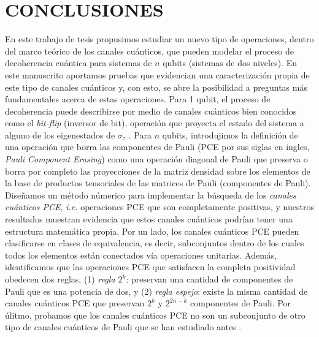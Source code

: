 

\chapter{CONCLUSIONES}
En este trabajo de tesis propusimos estudiar un nuevo tipo de operaciones, dentro
del marco teórico de los canales cuánticos, 
que pueden modelar el proceso de decoherencia cuántica para sistemas de $n$ qubits 
(sistemas de dos niveles). 
En este manuscrito aportamos pruebas que evidencian
una caracterización propia de este tipo de canales cuánticos
y, con esto, se abre la posibilidad a preguntas más fundamentales acerca de estas 
operaciones.
Para 1 qubit, el proceso de decoherencia
puede describirse por medio de canales cuánticos bien conocidos como 
el \textit{bit-flip} (inversor de bit), operación que proyecta el estado del 
sistema a alguno de los eigenestados de $\sigma_z$
\cite{bengtsson_zyczkowski_2017,nathanson2007pauli,nielsen_chuang_2011}. 
Para $n$ qubits, 
introdujimos la definición de una operación que borra las componentes de Pauli
(PCE por sus siglas en ingles, \textit{Pauli Component Erasing}) como una 
operación diagonal de Pauli que preserva o borra por completo 
las proyecciones de la matriz densidad sobre los elementos de la
base de productos tensoriales de las matrices de Pauli (componentes de Pauli). 
Diseñamos un método 
númerico para implementar la búsqueda de los \textit{canales cuánticos PCE},
\textit{i.e.} operaciones PCE que son completamente positivas, y nuestros 
resultados muestran evidencia que estos canales cuánticos podrían tener
una estructura matemática propia. 
Por un lado, los canales cuánticos PCE pueden clasificarse en clases de equivalencia, 
es decir, subconjuntos dentro de los cuales todos los elementos están 
conectados vía operaciones unitarias. 
Además, identificamos que las operaciones PCE 
que satisfacen la completa positividad obedecen dos reglas, (1) \textit{regla
$\mathit{2^k}$}: preservan una cantidad de componentes de Pauli
que es una potencia de dos, y (2) \textit{regla espejo}:
existe la misma cantidad de canales cuánticos PCE que preservan $2^k$ 
y $2^{2n-k}$ componentes de Pauli.
Por úlitmo, probamos que los canales cuánticos PCE no son un subconjunto
de otro tipo de canales cuánticos de Pauli que se han estudiado antes 
\cite{nathanson2007pauli}. 



